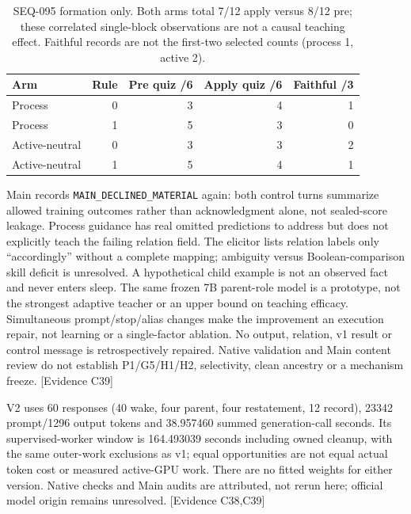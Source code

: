\documentclass[11pt]{article}
\newcommand{\ev}[1]{\textsf{[Evidence #1]}}
\begin{document}
\begin{table}[htbp]
\centering
\begin{tabular}{lrrrr}
\toprule
Arm & Rule & Pre quiz /6 & Apply quiz /6 & Faithful /3 \\
\midrule
Process & 0 & 3 & 4 & 1 \\
Process & 1 & 5 & 3 & 0 \\
Active-neutral & 0 & 3 & 3 & 2 \\
Active-neutral & 1 & 5 & 4 & 1 \\
\bottomrule
\end{tabular}
\caption{SEQ-095 formation only. Both arms total 7/12 apply versus 8/12 pre;
these correlated single-block observations are not a causal teaching effect.
Faithful records are not the first-two selected counts (process 1, active 2).}
\label{tab:rulegame095}
\end{table}

Main records \texttt{MAIN\_DECLINED\_MATERIAL} again: both control turns
summarize allowed training outcomes rather than acknowledgment alone, not
sealed-score leakage. Process guidance has real omitted predictions to address
but does not explicitly teach the failing relation field. The elicitor lists
relation labels only ``accordingly'' without a complete mapping; ambiguity
versus Boolean-comparison skill deficit is unresolved. A hypothetical child
example is not an observed fact and never enters sleep. The same frozen 7B
parent-role model is a prototype, not the strongest adaptive teacher or an
upper bound on teaching efficacy. Simultaneous prompt/stop/alias changes make
the improvement an execution repair, not learning or a single-factor ablation.
No output, relation, v1 result or control message is retrospectively repaired.
Native validation and Main content review do not establish P1/G5/H1/H2,
selectivity, clean ancestry or a mechanism freeze. \ev{C39}

V2 uses 60 responses (40 wake, four parent, four restatement, 12 record),
23342 prompt/1296 output tokens and 38.957460 summed generation-call seconds.
Its supervised-worker window is 164.493039 seconds including owned cleanup,
with the same outer-work exclusions as v1; equal opportunities are not equal
actual token cost or measured active-GPU work. There are no fitted weights for
either version. Native checks and Main audits are attributed, not rerun here;
official model origin remains unresolved. \ev{C38,C39}
\end{document}
